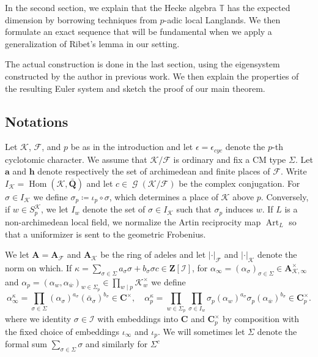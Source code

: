 \documentclass[leqno]{amsart}
\theoremstyle{definition}
\theoremstyle{remark}
\newcommand{\Q}{{\mathbf{Q}}}
\newcommand{\Z}{{\mathbf{Z}}}
\newcommand{\C}{\mathbf C}
\newcommand{\A}{\mathbf A}
\newcommand{\arch}{\mathbf{a}}
\newcommand{\finite}{\mathbf{h}}
\DeclareMathOperator{\Hom}{Hom}
\DeclareMathOperator{\Gal}{\mathcal{G}}
\DeclareMathOperator{\Art}{Art}
\newcommand{\F}{{\mathcal{F}}} %
\newcommand{\K}{{\mathcal{K}}} %
\newcommand{\bw}{{\overline{w}}}
\newcommand{\TT}{\mathbb{T}} %
\newcommand{\I}{\mathcal{I}} %
\begin{document}
In the second section, we explain 
that the Hecke algebra $\TT$ has the expected dimension
by borrowing techniques from $p$-adic local Langlands.
We then formulate an exact sequence that will be fundamental 
when we apply a generalization of Ribet's lemma in our setting.

The actual construction is done in the last section,
using the eigensystem constructed by the author in previous work.
We then explain the properties of the resulting Euler
system and  sketch the proof of our main theorem.



\subsection{Notations}

Let $\K$, $\F$, and $p$ be as in the introduction
and let $\epsilon=\epsilon_{cyc}$ denote 
the $p$-th cyclotomic character.
We assume that $\K/\F$ is ordinary 
and fix a CM type $\Sigma$.
Let $\arch$ and $\finite$ denote respectively
the set of archimedean and finite places of $\F$.
Write $I_\K=\Hom(\K,\bar{\Q})$ and 
let $c\in \Gal(\K/\F)$ be the complex conjugation.
For $\sigma\in I_\K$
we define $\sigma_p\coloneqq\iota_p\circ \sigma$,
which determines a place of $\K$ above $p$.
Conversely, if $w\in S_p^\K$,
we let $I_w$ denote the set of $\sigma\in I_\K$
such that $\sigma_p$ induces $w$.
If $L$ is a non-archimedean local field,
we normalize the Artin reciprocity map $\Art_L$
so that a uniformizer is sent to the geometric Frobenius.



We let $\A=\A_\F$ and $\A_\K$ be the ring of adeles
and let $|\cdot|_\F$ and $|\cdot|_\K$ denote the norm on which.
If $\kappa=\sum_{\sigma\in \Sigma} 
a_\sigma\sigma+b_\sigma\sigma c\in \Z[\I]$,
for $\alpha_\infty=(\alpha_\sigma)_{\sigma\in\Sigma}
\in \A_{\K,\infty}^\times$
and $\alpha_p=(\alpha_w,\alpha_{\bw})_{w\in\Sigma_p}\in 
\prod_{w\mid p}\K_w^\times$ we define 
\[
    \alpha_\infty^\kappa=
    \prod_{\sigma\in \Sigma} 
    (\alpha_\sigma)^{a_\sigma}(\bar{\alpha}_\sigma)^{b_\sigma}\in \C^\times,\quad
    \alpha_p^\kappa=
    \prod_{w\in \Sigma_p}
    \prod_{\sigma\in I_w}
    \sigma_p(\alpha_w)^{a_\sigma}\sigma_p(\alpha_{\bw})^{b_\sigma}
    \in \C_p^\times.
\]
where we identity $\sigma\in\I$ 
with embeddings into $\C$ and $\C_p^\times$ 
by composition with the fixed choice of embeddings 
$\iota_\infty$ and $\iota_p$.
We will sometimes
let $\Sigma$ denote the formal sum $\sum_{\sigma\in\Sigma}\sigma$
and similarly for $\Sigma^c$
\end{document}
